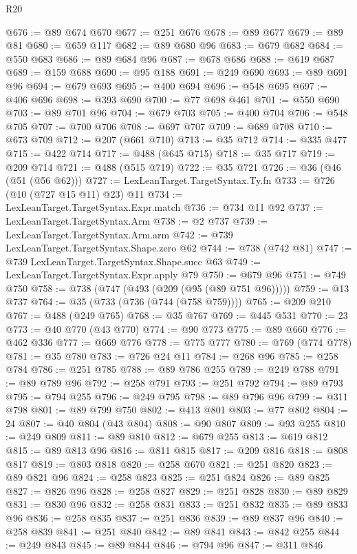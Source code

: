 \begin{lexlean}{R20}
\begin{coremodule}
@676 := @89 @674 @670
@677 := @251 @676
@678 := @89 @677
@679 := @89 @81
@680 := @659 @117
@682 := @89 @680 @96
@683 := @679 @682
@684 := @550 @683
@686 := @89 @684 @96
@687 := @678 @686
@688 := @619 @687
@689 := @159 @688
@690 := @95 @188
@691 := @249 @690
@693 := @89 @691 @96
@694 := @679 @693
@695 := @400 @694
@696 := @548 @695
@697 := @406 @696
@698 := @393 @690
@700 := @77 @698 @461
@701 := @550 @690
@703 := @89 @701 @96
@704 := @679 @703
@705 := @400 @704
@706 := @548 @705
@707 := @700 @706
@708 := @697 @707
@709 := @689 @708
@710 := @673 @709
@712 := @207 (@661 @710)
@713 := @35 @712
@714 := @335 @477
@715 := @422 @714
@717 := @488 (@645 @715)
@718 := @35 @717
@719 := @209 @714
@721 := @488 (@515 @719)
@722 := @35 @721
@726 := @36 (@46 (@51 (@56 @62)))
@727 := LexLeanTarget.TargetSyntax.Ty.fn
@733 := @726 (@10 (@727 @15 @11) @23) @11
@734 := LexLeanTarget.TargetSyntax.Expr.match
@736 := @734 @11 @92
@737 := LexLeanTarget.TargetSyntax.Arm
@738 := @2 @737
@739 := LexLeanTarget.TargetSyntax.Arm.arm
@742 := @739 LexLeanTarget.TargetSyntax.Shape.zero @62
@744 := @738 (@742 @81)
@747 := @739 LexLeanTarget.TargetSyntax.Shape.succ @63
@749 := LexLeanTarget.TargetSyntax.Expr.apply @79
@750 := @679 @96
@751 := @749 @750
@758 := @738 (@747 (@493 (@209 (@95 (@89 @751 @96)))))
@759 := @13 @737
@764 := @35 (@733 (@736 (@744 (@758 @759))))
@765 := @209 @210
@767 := @488 (@249 @765)
@768 := @35 @767
@769 := @445 @531
@770 := 23
@773 := @40 @770 (@43 @770)
@774 := @90 @773
@775 := @89 @660
@776 := @462 @336
@777 := @669 @776
@778 := @775 @777
@780 := @769 (@774 @778)
@781 := @35 @780
@783 := @726 @24 @11
@784 := @268 @96
@785 := @258 @784
@786 := @251 @785
@788 := @89 @786 @255
@789 := @249 @788
@791 := @89 @789 @96
@792 := @258 @791
@793 := @251 @792
@794 := @89 @793
@795 := @794 @255
@796 := @249 @795
@798 := @89 @796 @96
@799 := @311 @798
@801 := @89 @799 @750
@802 := @413 @801
@803 := @77 @802
@804 := 24
@807 := @40 @804 (@43 @804)
@808 := @90 @807
@809 := @93 @255
@810 := @249 @809
@811 := @89 @810
@812 := @679 @255
@813 := @619 @812
@815 := @89 @813 @96
@816 := @811 @815
@817 := @209 @816
@818 := @808 @817
@819 := @803 @818
@820 := @258 @670
@821 := @251 @820
@823 := @89 @821 @96
@824 := @258 @823
@825 := @251 @824
@826 := @89 @825
@827 := @826 @96
@828 := @258 @827
@829 := @251 @828
@830 := @89 @829
@831 := @830 @96
@832 := @258 @831
@833 := @251 @832
@835 := @89 @833 @96
@836 := @258 @835
@837 := @251 @836
@839 := @89 @837 @96
@840 := @258 @839
@841 := @251 @840
@842 := @89 @841
@843 := @842 @255
@844 := @249 @843
@845 := @89 @844
@846 := @794 @96
@847 := @311 @846

\end{coremodule}
\end{lexlean}
